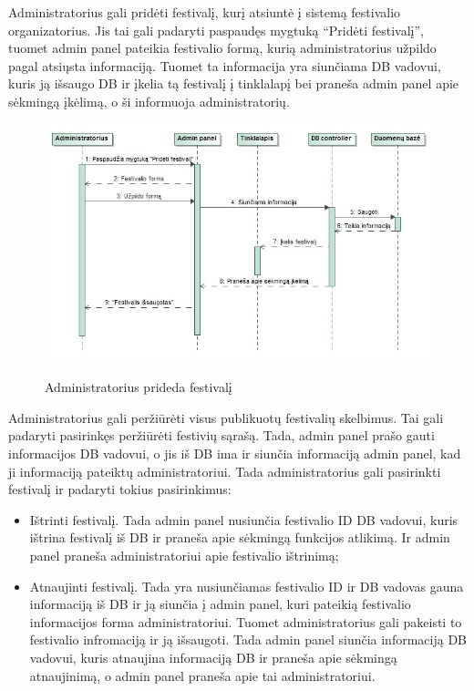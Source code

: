 ﻿\documentclass{VUMIFPSkursinis}
\begin{document}
Administratorius gali pridėti festivalį, kurį atsiuntė į sistemą festivalio organizatorius. Jis tai gali padaryti paspaudęs mygtuką “Pridėti festivalį”, tuomet admin panel pateikia festivalio formą, kurią administratorius užpildo pagal atsiųsta informaciją. Tuomet ta informacija yra siunčiama DB vadovui, kuris ją išsaugo DB ir įkelia tą festivalį į tinklalapį bei praneša admin panel apie sėkmingą įkėlimą, o ši informuoja administratorių.

\begin{figure}[H]
    \centering
    \includegraphics[scale=0.5]{img/Pav/AdminPridetiFestivali}
    \label{img:uml11}
	\caption{Administratorius prideda festivalį}
\end{figure}
	
Administratorius gali peržiūrėti visus publikuotų festivalių skelbimus. Tai gali padaryti pasirinkęs peržiūrėti festivių sąrašą. Tada, admin panel prašo gauti informacijos DB vadovui, o jis iš DB ima ir siunčia informaciją admin panel, kad ji informaciją pateiktų administratoriui. Tada administratorius gali pasirinkti festivalį ir padaryti tokius pasirinkimus: 
\begin{itemize}
\item Ištrinti festivalį. Tada admin panel nusiunčia festivalio ID DB vadovui, kuris ištrina festivalį iš DB ir praneša apie sėkmingą funkcijos atlikimą. Ir admin panel praneša administratoriui apie festivalio ištrinimą;
\item Atnaujinti festivalį. Tada yra nusiunčiamas festivalio ID ir DB vadovas gauna informaciją iš DB ir ją siunčia į admin panel, kuri pateikią festivalio informacijos forma administratoriui. Tuomet administratorius gali pakeisti to festivalio infromaciją ir ją išsaugoti. Tada admin panel siunčia informaciją DB vadovui, kuris atnaujina informaciją DB ir praneša apie sėkmingą atnaujinimą, o admin panel praneša apie tai administratoriui. 
\end{itemize}
	
\end{document}
